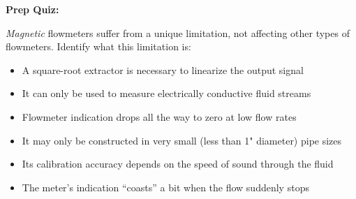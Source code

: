 \vfil \eject

\noindent
{\bf Prep Quiz:}

{\it Magnetic} flowmeters suffer from a unique limitation, not affecting other types of flowmeters.  Identify what this limitation is:

\begin{itemize}
\item{} A square-root extractor is necessary to linearize the output signal
\vskip 5pt 
\item{} It can only be used to measure electrically conductive fluid streams
\vskip 5pt 
\item{} Flowmeter indication drops all the way to zero at low flow rates
\vskip 5pt 
\item{} It may only be constructed in very small (less than 1" diameter) pipe sizes
\vskip 5pt 
\item{} Its calibration accuracy depends on the speed of sound through the fluid
\vskip 5pt 
\item{} The meter's indication ``coasts'' a bit when the flow suddenly stops
\end{itemize}




